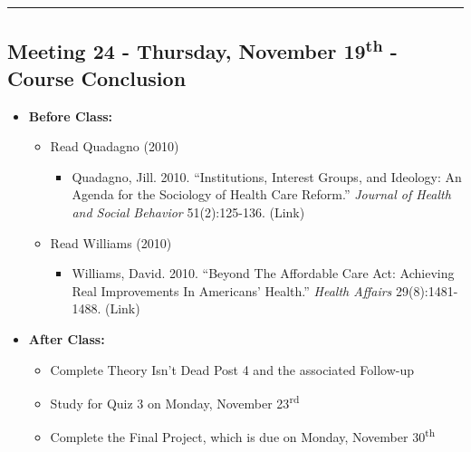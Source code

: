 \documentclass[
]{book}
\providecommand{\tightlist}{%
  \setlength{\itemsep}{0pt}\setlength{\parskip}{0pt}}
\begin{document}
\begin{center}\rule{0.5\linewidth}{0.5pt}\end{center}

\hypertarget{meeting-24---thursday-november-19th---course-conclusion}{%
\subsection*{\texorpdfstring{Meeting 24 - Thursday, November 19\textsuperscript{th} - Course Conclusion}{Meeting 24 - Thursday, November 19th - Course Conclusion}}\label{meeting-24---thursday-november-19th---course-conclusion}}

\begin{itemize}
\tightlist
\item
  \textbf{Before Class:}

  \begin{itemize}
  \tightlist
  \item
    Read Quadagno (2010)

    \begin{itemize}
    \tightlist
    \item
      Quadagno, Jill. 2010. ``Institutions, Interest Groups, and Ideology: An Agenda for the Sociology of Health Care Reform.'' \emph{Journal of Health and Social Behavior} 51(2):125-136. (Link)
    \end{itemize}
  \item
    Read Williams (2010)

    \begin{itemize}
    \tightlist
    \item
      Williams, David. 2010. ``Beyond The Affordable Care Act: Achieving Real Improvements In Americans' Health.'' \emph{Health Affairs} 29(8):1481-1488. (Link)
    \end{itemize}
  \end{itemize}
\item
  \textbf{After Class:}

  \begin{itemize}
  \tightlist
  \item
    Complete Theory Isn't Dead Post 4 and the associated Follow-up
  \item
    Study for Quiz 3 on Monday, November 23\textsuperscript{rd}
  \item
    Complete the Final Project, which is due on Monday, November 30\textsuperscript{th}
  \end{itemize}
\end{itemize}
\end{document}
